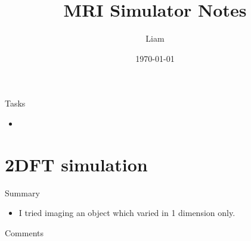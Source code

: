 \documentclass[dvipsnames]{beamer}
\title{MRI Simulator Notes}
\author{Liam}
\date{\today}
\begin{document}
\begin{frame}
\maketitle
\end{frame}

\begin{frame}{Tasks}
\begin{itemize}
\item 
\end{itemize}
\end{frame}

\section{2DFT simulation}

\begin{frame}{Summary}
\begin{itemize}
\item I tried imaging an object which varied in 1 dimension only.
\end{itemize}
\end{frame}


\begin{frame}{Comments}

\end{frame}
\end{document}
